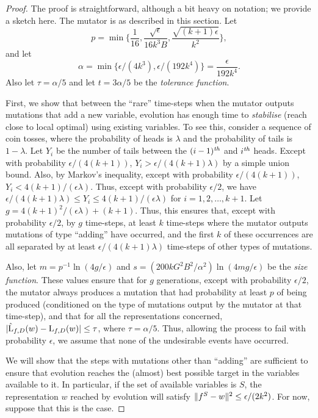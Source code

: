 \begin{proof} The proof is straightforward, although a bit heavy on notation; we
provide a sketch here. The mutator is as described in this section. Let
\[ p = \min\{ \frac{1}{16}, \frac{\sqrt{\epsilon}}{16k^3 B},
\frac{\sqrt{(k+1)\epsilon}}{k^2} \}, \]
and let
\[ \alpha = \min\{\epsilon/(4k^3), \epsilon/(192k^4)\} = \frac{\epsilon}{192k^4}. \]
Also let $\tau = \alpha/5$ and let $t = 3\alpha/5$ be the \emph{tolerance
function}.

First, we show that between the ``rare'' time-steps when the mutator outputs
mutations that add a new variable, evolution has enough time to \emph{stabilise}
(reach close to local optimal) using existing variables. To see this, consider a
sequence of coin tosses, where the probability of heads is $\lambda$ and the
probability of tails is $1 - \lambda$. Let $Y_i$ be the number of tails between
the $(i-1){^{\textit{th}}}$ and $i{^{\textit{th}}}$ heads. Except with probability $\epsilon/(4(k+1))$,
$Y_i > \epsilon/(4(k+1)\lambda)$ by a simple union bound.  Also, by Markov's
inequality, except with probability $\epsilon/(4(k+1))$, $Y_i <
4(k+1)/(\epsilon\lambda)$. Thus, except with probability $\epsilon/2$, we have
$\epsilon/(4(k+1)\lambda) \leq Y_i \leq 4(k+1)/(\epsilon\lambda)$ for $i = 1, 2,
\ldots, k+1$. Let $g = 4(k+1)^2/(\epsilon\lambda) + (k+1)$. Thus, this ensures
that, except with probability $\epsilon/2$, by $g$ time-steps, at least $k$
time-steps where the mutator outputs mutations of type ``adding'' have occurred,
and the first $k$ of these occurrences are all separated by at least
$\epsilon/(4(k+1) \lambda)$ time-steps of other types of mutations.

Also, let $m = p^{-1}\ln(4g/\epsilon)$ and $s = (200 kG^2B^2/\alpha^2)
\ln(4mg/\epsilon)$ be the \emph{size function}.  These values ensure that for
$g$ generations, except with probability $\epsilon/2$, the mutator always
produces a mutation that had probability at least $p$ of being produced
(conditioned on the type of mutations output by the mutator at that time-step),
and that for all the representations concerned, $|\hat{\mathrm{L}}_{f, D}(w) -
\mathrm{L}_{f, D}(w)| \leq \tau$, where $\tau = \alpha/5$. Thus, allowing the process
to fail with probability $\epsilon$, we assume that none of the undesirable
events have occurred.

We will show that the steps with mutations other than ``adding'' are sufficient
to ensure that evolution reaches the (almost) best possible target in the
variables available to it. In particular, if the set of available variables is
$S$, the representation $w$ reached by evolution will satisfy $\Vert f^S -
w \Vert^2 \leq \epsilon/(2k^2)$. For now, suppose that this is the case. 


\end{proof}

